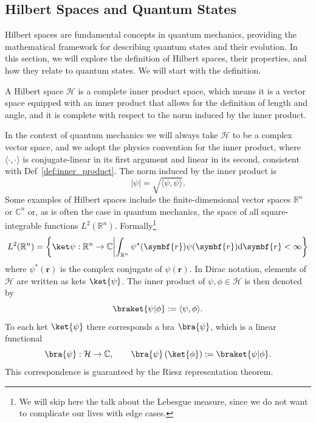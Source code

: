 \subsection{Hilbert Spaces and Quantum States}\label{sec:hilbert_spaces_and_quantum_states}
Hilbert spaces are fundamental concepts in quantum mechanics, providing the mathematical framework for describing quantum states and their evolution. In this section, we will explore the definition of Hilbert spaces, their properties, and how they relate to quantum states. We will start with the definition.
\begin{definition}
A Hilbert space $\mathcal{H}$ is a complete inner product space, which means it is a vector space equipped with an inner product that allows for the definition of length and angle, and it is complete with respect to the norm induced by the inner product.
\end{definition}
In the context of quantum mechanics we will always take $\mathcal{H}$ to be a complex vector space, and we adopt the physics convention for the inner product, where $\langle\cdot,\cdot\rangle$ is conjugate-linear in its first argument and linear in its second, consistent with Def~\ref{def:inner_product}. The norm induced by the inner product is
\begin{equation}
\lvert\psi\rvert=\sqrt{\langle\psi,\psi\rangle}.
\end{equation}
Some examples of Hilbert spaces include the finite-dimensional vector spaces $\mathbb{R}^n$ or $\mathbb{C}^n$ or, as is often the case in quantum mechanics, the space of all square-integrable functions $L^2(\mathbb{R}^n)$. Formally\footnote{We will skip here the talk about the Lebesgue measure, since we do not want to complicate our lives with edge cases.}
\begin{equation}
L^2(\mathbb{R}^n)=\left\lbrace\ket\psi :\mathbb{R}^n\to\mathbb{C}\middle\vert\int_{\mathbb{R}^n}\psi^*(\symbf{r})\psi(\symbf{r})\mathrm{d}\symbf{r}<\infty\right\rbrace
\end{equation}
where $\psi^*(\symbf{r})$ is the complex conjugate of $\psi(\symbf{r})$. In Dirac notation, elements of $\mathcal{H}$ are written as kets $\ket{\psi}$. The inner product of $\psi,\phi\in\mathcal{H}$ is then denoted by
\begin{equation}
\braket{\psi\vert\phi}:=\langle\psi,\phi\rangle.
\end{equation}
To each ket $\ket{\psi}$ there corresponds a bra $\bra{\psi}$, which is a linear functional
\begin{equation}
\bra{\psi}:\mathcal{H}\to\mathbb{C},\qquad\bra{\psi}\left(\ket{\phi}\right):=\braket{\psi|\phi}.
\end{equation}
This correspondence is guaranteed by the Riesz representation theorem.\supercite{1423848155}

